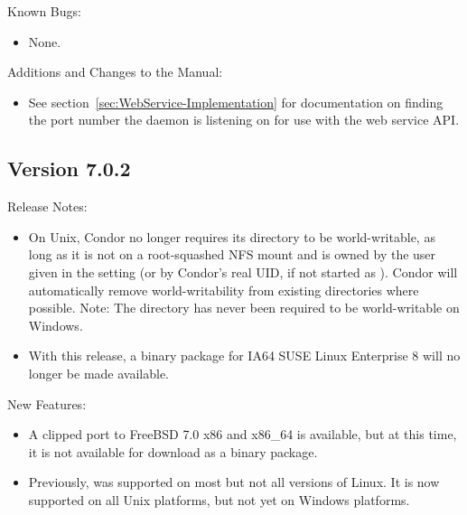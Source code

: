 \noindent Known Bugs:

\begin{itemize}

\item None.

\end{itemize}

\noindent Additions and Changes to the Manual:

\begin{itemize}

\item See 
  section~\ref{sec:WebService-Implementation}
  for documentation on finding the port number the  daemon
  is listening on for use with the web service API.

\end{itemize}


\subsection*{\label{sec:New-7-0-2}Version 7.0.2}

\noindent Release Notes:

\begin{itemize}

\item On Unix, Condor no longer requires its  directory to
be world-writable, as long as it is not on a root-squashed NFS mount and is
owned by the user given in the  setting (or by Condor's
real UID, if not started as ). Condor will automatically remove
world-writability from existing  directories where possible.
Note: The  directory has never been required to be
world-writable on Windows.

\item With this release, a binary package for IA64 SUSE Linux Enterprise 8
will no longer be made available.

\end{itemize}


\noindent New Features:

\begin{itemize}

\item A clipped port to FreeBSD 7.0 x86 and x86\_64 is available, but at this
time, it is not available for download as a binary package.

\item Previously,   was supported on most
but not all versions of Linux.  It is now supported on all Unix platforms,
but not yet on Windows platforms.

\end{itemize}

